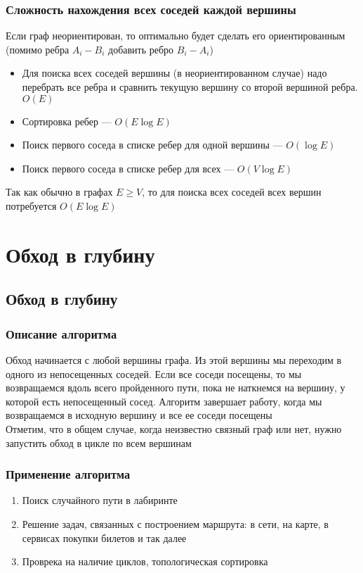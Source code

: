 \documentclass[a4paper]{article}
\begin{document}
\subsubsection*{Сложность нахождения всех соседей каждой вершины}
Если граф неориентирован, то оптимально будет сделать его ориентированным (помимо ребра $A_i-B_i$ добавить ребро $B_i-A_i$)
\begin{itemize}
    \item Для поиска всех соседей вершины (в неориентированном случае) надо перебрать все ребра и сравнить текущую вершину со второй вершиной ребра. $O(E)$
    \item Сортировка ребер — $O(E\log E)$
    \item Поиск первого соседа в списке ребер для одной вершины — $O(\log E)$
    \item Поиск первого соседа в списке ребер для всех — $O(V\log E)$
\end{itemize}
Так как обычно в графах $E\geqslant V$, то для поиска всех соседей всех вершин потребуется $O(E\log E)$

\newpage
\section{Обход в глубину}
\subsection{Обход в глубину}
\subsubsection*{Описание алгоритма}
Обход начинается с любой вершины графа. Из этой вершины мы переходим в одного из непосещенных соседей. Если все соседи посещены, то мы возвращаемся вдоль всего пройденного пути, пока не наткнемся на вершину, у которой есть непосещенный сосед. Алгоритм завершает работу, когда мы возвращаемся в исходную вершину и все ее соседи посещены\\[2mm]
Отметим, что в общем случае, когда неизвестно связный граф или нет, нужно запустить обход в цикле по всем вершинам
\subsubsection*{Применение алгоритма}
\begin{enumerate}
    \item Поиск случайного пути в лабиринте
    \item Решение задач, связанных с построением маршрута: в сети, на карте, в сервисах покупки билетов и так далее
    \item Проврека на наличие циклов, топологическая сортировка
\end{enumerate}
\end{document}
